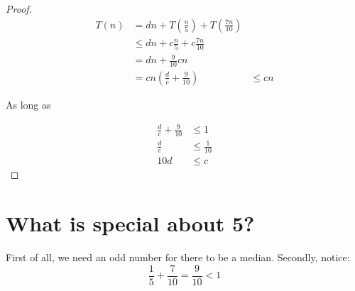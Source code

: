 \begin{proof}
\begin{align*}
T(n)
&= dn + T \left( \frac{n}{5} \right) +T \left( \frac{7n}{10} \right) \\
&\leq dn + c \frac{n}{5} + c \frac{7n}{10} \\
&= dn + \frac{9}{10}cn \\
&= cn \left( \frac{d}{c} + \frac{9}{10} \right)
&\leq cn
\end{align*}

As long as

\begin{align*}
\frac{d}{c} + \frac{9}{10} &\leq 1 \\
\frac{d}{c} &\leq \frac{1}{10} \\
10 d &\leq c
\end{align*}
\end{proof}

\section{What is special about 5?}

First of all, we need an odd number for there to be a median.
Secondly, notice:
%
\begin{displaymath}
\frac{1}{5} + \frac{7}{10} = \frac{9}{10} < 1
\end{displaymath}
